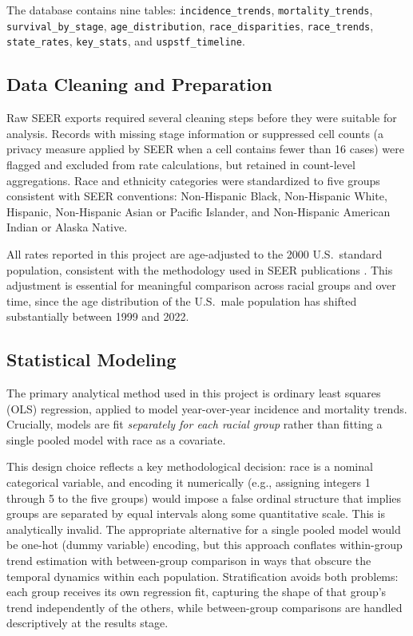 \documentclass[12pt]{article}
\begin{document}
The database contains nine tables: \texttt{incidence\_trends},
\texttt{mortality\_trends}, \texttt{survival\_by\_stage}, \texttt{age\_distribution},
\texttt{race\_disparities}, \texttt{race\_trends}, \texttt{state\_rates},
\texttt{key\_stats}, and \texttt{uspstf\_timeline}.

\subsection{Data Cleaning and Preparation}

Raw SEER exports required several cleaning steps before they were suitable for
analysis. Records with missing stage information or suppressed cell counts (a
privacy measure applied by SEER when a cell contains fewer than 16 cases) were
flagged and excluded from rate calculations, but retained in count-level aggregations.
Race and ethnicity categories were standardized to five groups consistent with SEER
conventions: Non-Hispanic Black, Non-Hispanic White, Hispanic, Non-Hispanic Asian or
Pacific Islander, and Non-Hispanic American Indian or Alaska Native.

All rates reported in this project are age-adjusted to the 2000 U.S.\ standard
population, consistent with the methodology used in SEER publications \cite{seer2024}.
This adjustment is essential for meaningful comparison across racial groups and over
time, since the age distribution of the U.S.\ male population has shifted
substantially between 1999 and 2022.

\subsection{Statistical Modeling}

The primary analytical method used in this project is ordinary least squares (OLS)
regression, applied to model year-over-year incidence and mortality trends.
Crucially, models are fit \textit{separately for each racial group} rather than
fitting a single pooled model with race as a covariate.

This design choice reflects a key methodological decision: race is a nominal
categorical variable, and encoding it numerically (e.g., assigning integers
1 through 5 to the five groups) would impose a false ordinal structure that implies
groups are separated by equal intervals along some quantitative scale. This is
analytically invalid. The appropriate alternative for a single pooled model would be
one-hot (dummy variable) encoding, but this approach conflates within-group trend
estimation with between-group comparison in ways that obscure the temporal dynamics
within each population. Stratification avoids both problems: each group receives its
own regression fit, capturing the shape of that group's trend independently of the
others, while between-group comparisons are handled descriptively at the results stage.
\end{document}
